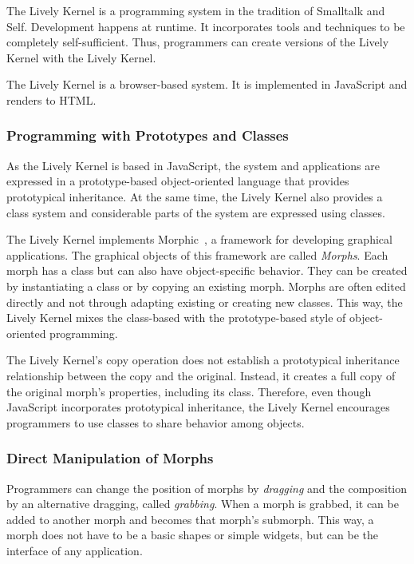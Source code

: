 The Lively Kernel is a programming system in the tradition of Smalltalk and Self.
Development happens at runtime.
It incorporates tools and techniques to be completely self-sufficient.
Thus, programmers can create versions of the Lively Kernel with the Lively Kernel.

The Lively Kernel is a browser-based system.
It is implemented in JavaScript and renders to \ac{HTML}.

\subsubsection{Programming with Prototypes and Classes}

As the Lively Kernel is based in JavaScript, the system and applications are expressed in a prototype-based object-oriented language that provides prototypical inheritance.
At the same time, the Lively Kernel also provides a class system and considerable parts of the system are expressed using classes.

The Lively Kernel implements Morphic~\cite{Maloney1995Mor}, a framework for developing graphical applications.
The graphical objects of this framework are called \emph{Morphs}.
Each morph has a class but can also have object-specific behavior.
They can be created by instantiating a class or by copying an existing morph.
Morphs are often edited directly and not through adapting existing or creating new classes.
This way, the Lively Kernel mixes the class-based with the prototype-based style of object-oriented programming.

The Lively Kernel's copy operation does not establish a prototypical inheritance relationship between the copy and the original.
Instead, it creates a full copy of the original morph's properties, including its class.
Therefore, even though JavaScript incorporates prototypical inheritance, the Lively Kernel encourages programmers to use classes to share behavior among objects.

\subsubsection{Direct Manipulation of Morphs}

Programmers can change the position of morphs by \emph{dragging} and the composition by an alternative dragging, called \emph{grabbing}.
When a morph is grabbed, it can be added to another morph and becomes that morph's submorph.
This way, a morph does not have to be a basic shapes or simple widgets, but can be the interface of any application.

